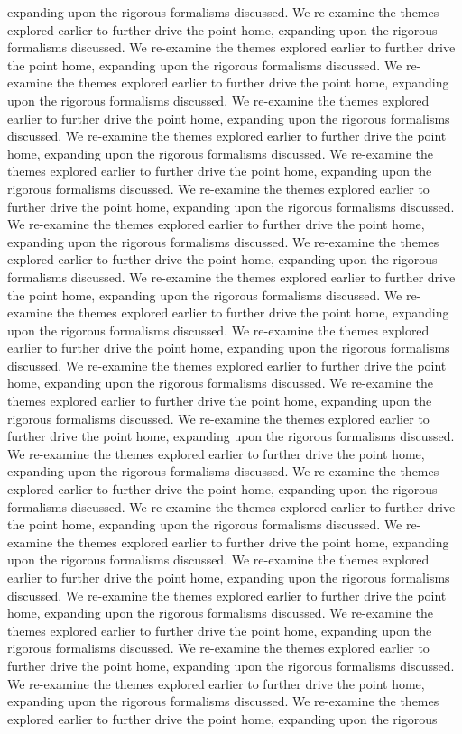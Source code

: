 expanding upon the rigorous formalisms discussed. We re-examine the themes explored earlier to further drive the point home, expanding upon the rigorous formalisms discussed. We re-examine the themes explored earlier to further drive the point home, expanding upon the rigorous formalisms discussed. We re-examine the themes explored earlier to further drive the point home, expanding upon the rigorous formalisms discussed. We re-examine the themes explored earlier to further drive the point home, expanding upon the rigorous formalisms discussed. We re-examine the themes explored earlier to further drive the point home, expanding upon the rigorous formalisms discussed. We re-examine the themes explored earlier to further drive the point home, expanding upon the rigorous formalisms discussed. We re-examine the themes explored earlier to further drive the point home, expanding upon the rigorous formalisms discussed. We re-examine the themes explored earlier to further drive the point home, expanding upon the rigorous formalisms discussed. We re-examine the themes explored earlier to further drive the point home, expanding upon the rigorous formalisms discussed. We re-examine the themes explored earlier to further drive the point home, expanding upon the rigorous formalisms discussed. We re-examine the themes explored earlier to further drive the point home, expanding upon the rigorous formalisms discussed. We re-examine the themes explored earlier to further drive the point home, expanding upon the rigorous formalisms discussed. We re-examine the themes explored earlier to further drive the point home, expanding upon the rigorous formalisms discussed. We re-examine the themes explored earlier to further drive the point home, expanding upon the rigorous formalisms discussed. We re-examine the themes explored earlier to further drive the point home, expanding upon the rigorous formalisms discussed. We re-examine the themes explored earlier to further drive the point home, expanding upon the rigorous formalisms discussed. We re-examine the themes explored earlier to further drive the point home, expanding upon the rigorous formalisms discussed. We re-examine the themes explored earlier to further drive the point home, expanding upon the rigorous formalisms discussed. We re-examine the themes explored earlier to further drive the point home, expanding upon the rigorous formalisms discussed. We re-examine the themes explored earlier to further drive the point home, expanding upon the rigorous formalisms discussed. We re-examine the themes explored earlier to further drive the point home, expanding upon the rigorous formalisms discussed. We re-examine the themes explored earlier to further drive the point home, expanding upon the rigorous formalisms discussed. We re-examine the themes explored earlier to further drive the point home, expanding upon the rigorous formalisms discussed. We re-examine the themes explored earlier to further drive the point home, expanding upon the rigorous formalisms discussed. We re-examine the themes explored earlier to further drive the point home, expanding upon the rigorous 